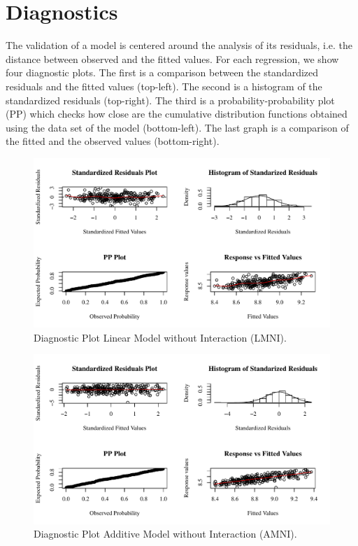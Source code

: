 \documentclass{article}\usepackage[]{graphicx}\usepackage[]{color}
\begin{document}
\newpage

\section{Diagnostics} \label{subsec:Diagnostics}

The validation of a model is centered around the analysis of its residuals, i.e. the distance between observed and the fitted values. For each regression, we show four diagnostic plots. The first is a comparison between the standardized residuals and the fitted values (top-left). The second is a histogram of the standardized residuals (top-right). The third is a probability-probability plot (PP) which checks how close are the cumulative distribution functions obtained using the data set of the model (bottom-left). The last graph is a comparison of the fitted and the observed values (bottom-right). 

\begin{figure}[bp!]
\centering
\includegraphics[scale=0.8]{Diag_b_lm_no_2004.pdf}
\caption{Diagnostic Plot Linear Model without Interaction (LMNI).}
\label{fig:Diag LMNI}
\end{figure}

\begin{figure}[bp!]
\centering
\includegraphics[scale=0.8]{Diag_b_gamm_2004.pdf}
\caption{Diagnostic Plot Additive Model without Interaction (AMNI).}
\label{fig:Diag AMNI}
\end{figure}
\end{document}
